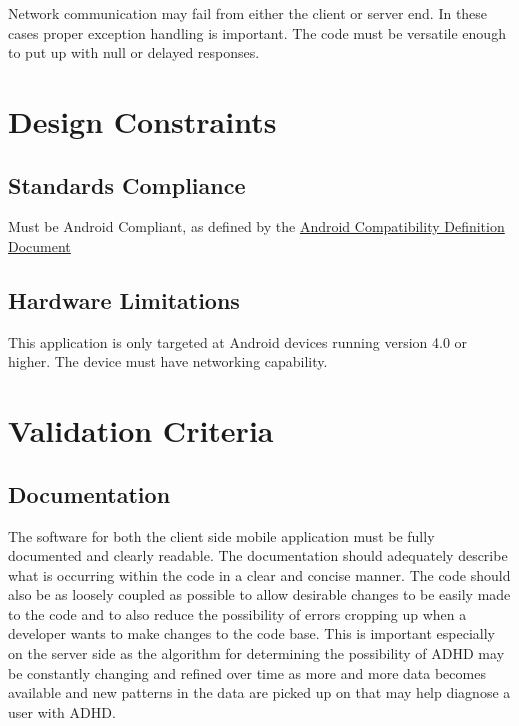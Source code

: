 \documentclass[a4wide]{article}
\begin{document}
Network communication may fail from either the client or server end.
In these cases proper exception handling is important.
The code must be versatile enough to put up with null or delayed responses.



\section{Design Constraints}

\subsection{Standards Compliance}

Must be Android Compliant, as defined by the \href{http://static.googleusercontent.com/media/source.android.com/en/us/compatibility/4.0/android-4.0-cdd.pdf}{Android Compatibility Definition Document}

\subsection{Hardware Limitations}

This application is only targeted at Android devices running version 4.0 or 
higher. The device must have networking capability.





\section{Validation Criteria}

\subsection{Documentation}
The software for both the client side mobile application must be fully
documented and clearly readable. The documentation should adequately describe
what is occurring within the code in a clear and concise manner. The code should
also be as loosely coupled as possible to allow desirable changes to be easily
made to the code and to also reduce the possibility of errors cropping up when
a developer wants to make changes to the code base. This is important especially
on the server side as the algorithm for determining the possibility of ADHD may
be constantly changing and refined over time as more and more data becomes
available and new patterns in the data are picked up on that may help diagnose a
user with ADHD.
\end{document}
